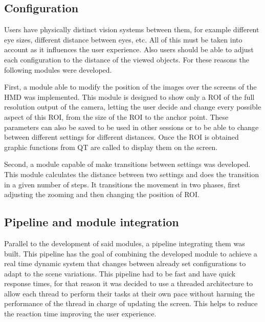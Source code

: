 \documentclass[10pt,a4paper,twocolumn,twoside]{article}
\begin{document}
	\subsection{Configuration}
	
	Users have physically distinct vision systems between them, for example different eye sizes, different distance between eyes, etc. All of this must be taken into account as it influences the user experience. Also users should be able to adjust each configuration to the distance of the viewed objects.  For these reasons the following modules were developed.
	
	First, a module able to modify the position of the images over the screens of the HMD was implemented. This module is designed to show only a ROI of the full resolution output of the camera, letting the user decide and change every possible aspect of this ROI, from the size of the ROI to the anchor point. These parameters can also be saved to be used in other sessions or to be able to change between different settings for different distances. Once the ROI is obtained graphic functions from QT are called to display them on the screen.
	
	Second, a module capable of make transitions between settings was developed. This module calculates the distance between two settings and does the transition in a given number of steps. It transitions the movement in two phases, first adjusting the zooming and then changing the position of ROI.
	
	\subsection{Pipeline and module integration}
	\label{sec:pipeline}
	
	Parallel to the development of said modules, a pipeline integrating them was built. This pipeline has the goal of combining the developed module to achieve a real time dynamic system that changes between already set configurations to adapt to the scene variations. This pipeline had to be fast and have quick response times, for that reason it was decided to use a threaded architecture to allow each thread to perform their tasks at their own pace without harming the performance of the thread in charge of updating the screen. This helps to reduce the reaction time improving the user experience. 
	
\end{document}
